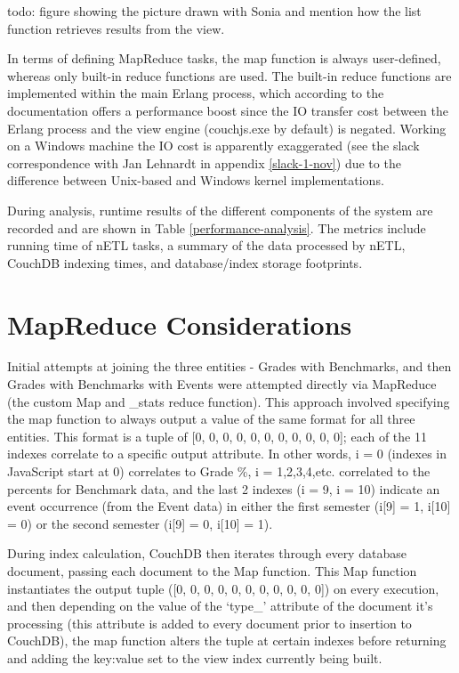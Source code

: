todo: figure showing the picture drawn with Sonia and mention how the list function retrieves results from the view.

In terms of defining MapReduce tasks, the map function is always user-defined, whereas only built-in reduce functions are used. The built-in reduce functions are implemented within the main Erlang process, which according to the documentation offers a performance boost since the IO transfer cost between the Erlang process and the view engine (couchjs.exe by default) is negated. Working on a Windows machine the IO cost is apparently exaggerated (see the slack correspondence with Jan Lehnardt in appendix \ref{slack-1-nov}) due to the difference between Unix-based and Windows kernel implementations.

During analysis, runtime results of the different components of the system are recorded and are shown in Table \ref{performance-analysis}. The metrics include running time of nETL tasks, a summary of the data processed by nETL, CouchDB indexing times, and database/index storage footprints.



\section{MapReduce Considerations}
Initial attempts at joining the three entities - Grades with Benchmarks, and then Grades with Benchmarks with Events were attempted directly via MapReduce (the custom Map and \_stats reduce function). This approach involved specifying the map function to always output a value of the same format for all three entities. This format is a tuple of [0, 0, 0, 0, 0, 0, 0, 0, 0, 0, 0]; each of the 11 indexes correlate to a specific output attribute. In other words, i = 0 (indexes in JavaScript start at 0) correlates to Grade \%, i = 1,2,3,4,etc. correlated to the percents for Benchmark data, and the last 2 indexes (i = 9, i = 10) indicate an event occurrence (from the Event data) in either the first semester (i[9] = 1, i[10] = 0) or the second semester (i[9] = 0, i[10] = 1).

During index calculation, CouchDB then iterates through every database document, passing each document to the Map function. This Map function instantiates the output tuple ([0, 0, 0, 0, 0, 0, 0, 0, 0, 0, 0]) on every execution, and then depending on the value of the `type\_' attribute of the document it's processing (this attribute is added to every document prior to insertion to CouchDB), the map function alters the tuple at certain indexes before returning and adding the key:value set to the view index currently being built.

